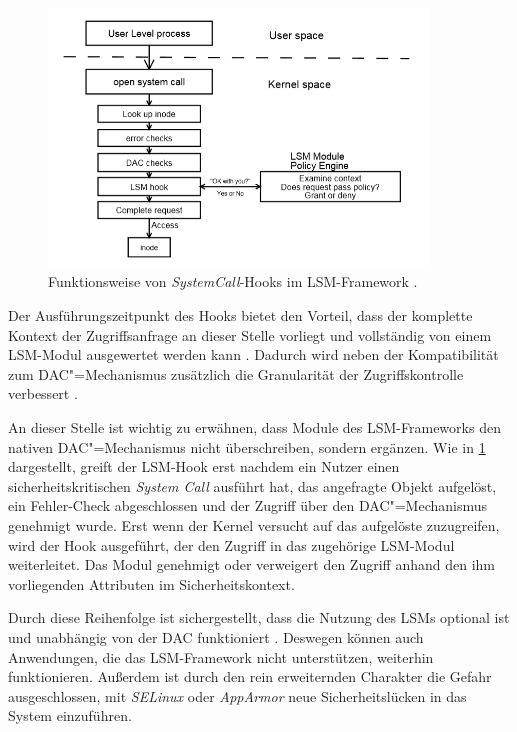 \documentclass[../main.tex]{subfiles}
\begin{document}
			\begin{figure}[h]
					\centering
					\includegraphics[width=0.9\textwidth]{./images/sec_LSMHook.jpg}
					\caption{Funktionsweise von \emph{\gls{SystemCall}}-Hooks im LSM-Framework \cite[S.3]{LSMFramework}.}
					\label{fig:sec_LSMHook}
			\end{figure}

			\vspace{0.5cm}

			Der Ausführungszeitpunkt des Hooks bietet den Vorteil, dass der komplette Kontext der Zugriffsanfrage an dieser Stelle vorliegt und vollständig von einem LSM-Modul ausgewertet werden kann \cite[S.2]{LSMFramework}. Dadurch wird neben der Kompatibilität zum DAC"=Mechanismus zusätzlich die Granularität der Zugriffskontrolle verbessert \cite{LSMDesign}.

			An dieser Stelle ist wichtig zu erwähnen, dass Module des LSM-Frameworks den nativen DAC"=Mechanismus nicht überschreiben, sondern ergänzen. Wie in \fig \ref{fig:sec_LSMHook} dargestellt, greift der LSM-Hook erst nachdem ein Nutzer einen sicherheitskritischen \emph{System Call} ausführt hat, das angefragte Objekt aufgelöst, ein Fehler-Check abgeschlossen und der Zugriff über den DAC"=Mechanismus genehmigt wurde. Erst wenn der Kernel versucht auf das aufgelöste  zuzugreifen, wird der Hook ausgeführt, der den Zugriff in das zugehörige LSM-Modul weiterleitet. Das Modul genehmigt oder verweigert den Zugriff anhand den ihm vorliegenden Attributen im Sicherheitskontext.

			Durch diese Reihenfolge ist sichergestellt, dass die Nutzung des LSMs optional ist und unabhängig von der DAC funktioniert \cite{centOsMCS}. Deswegen können auch Anwendungen, die das LSM-Framework nicht unterstützen, weiterhin funktionieren. Außerdem ist durch den rein erweiternden Charakter die Gefahr ausgeschlossen, mit \emph{SELinux} oder \emph{AppArmor} neue Sicherheitslücken in das System einzuführen.
\end{document}
